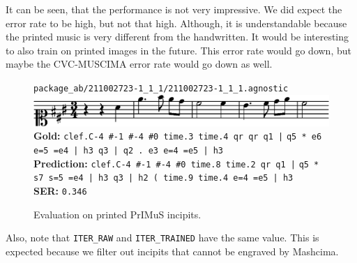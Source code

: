 It can be seen, that the performance is not very impressive. We did expect the error rate to be high, but not that high. Although, it is understandable because the printed music is very different from the handwritten. It would be interesting to also train on printed images in the future. This error rate would go down, but maybe the CVC-MUSCIMA error rate would go down as well.

\begin{figure}[h]
    \centering
    \verb`package_ab/211002723-1_1_1/211002723-1_1_1.agnostic`
    \\
    \medskip
    \includegraphics[width=140mm]{../img/evaluation-on-printed}
    \textbf{Gold:}
    \verb`clef.C-4 #-1 #-4 #0 time.3 time.4 qr qr q1 |`
    \verb`q5 * e6 e=5 =e4 | h3 q3 | q2 . e3 e=4 =e5 | h3`
    \\
    \medskip
    \textbf{Prediction:}
    \verb`clef.C-4 #-1 #-4 #0 time.8 time.2 qr q1 |`
    \verb`q5 * s7 s=5 =e4 | h3 q3 | h2 ( time.9 time.4 e=4 =e5 | h3`
    \\
    \medskip
    \textbf{SER:}
    \verb`0.346`
    \caption{Evaluation on printed PrIMuS incipits.}
    \label{fig6:EvaluatinoOnPrinted}
\end{figure}

Also, note that \verb`ITER_RAW` and \verb`ITER_TRAINED` have the same value. This is expected because we filter out incipits that cannot be engraved by Mashcima.
